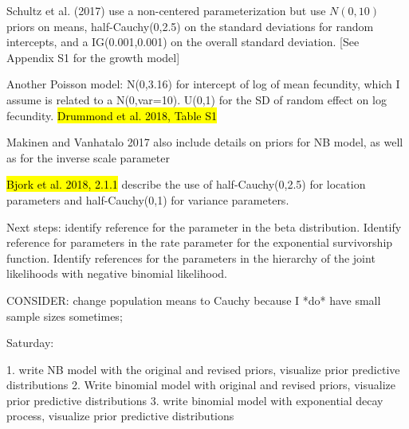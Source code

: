 \documentclass[12pt, oneside, titlepage]{article}   	%
\begin{document}
Schultz et al. (2017) use a non-centered parameterization but use $N(0,10)$ priors on means, half-Cauchy(0,2.5) on the standard deviations for random intercepts, and a IG(0.001,0.001) on the overall standard deviation. [See Appendix S1 for the growth model]

Another Poisson model: N(0,3.16) for intercept of log of mean fecundity, which I assume is related to a N(0,var=10). U(0,1) for the SD of random effect on log fecundity. \hl{Drummond et al. 2018, Table S1}

Makinen and Vanhatalo 2017 also include details on priors for NB model, as well as for the inverse scale parameter

\hl{Bjork et al. 2018, 2.1.1} describe the use of half-Cauchy(0,2.5) for location parameters and half-Cauchy(0,1) for variance parameters.

Next steps: identify reference for the parameter in the beta distribution. Identify reference for parameters in the rate parameter for the exponential survivorship function. Identify references for the parameters in the hierarchy of the joint likelihoods with negative binomial likelihood. 

CONSIDER: change population means to Cauchy because I *do* have small sample sizes sometimes; 

Saturday:

1. write NB model with the original and revised priors, visualize prior predictive distributions
2. Write binomial model with original and revised priors, visualize prior predictive distributions
3. write binomial model with exponential decay process, visualize prior predictive distributions

\fi




%

\end{document}

